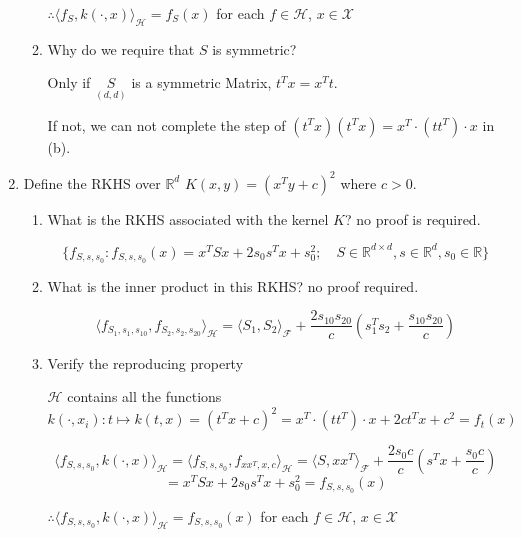 \documentclass[11pt]{article}
\DeclareMathOperator{\trace}{trace}
\begin{document}
\begin{enumerate}
\begin{enumerate}
$\therefore\langle f_{S},k(\cdot,x)\rangle_{\mathcal{H}}=f_{S}(x)$ for each $f\in\mathcal{H}$, $x\in\mathcal{X}$


\item Why do we require that $S$ is symmetric?

Only if $\underset{(d,d)}{S}$ is a symmetric Matrix, $t^Tx=x^Tt$.


If not, we can not complete the step of $(t^Tx)(t^Tx)=x^T\cdot (tt^T)\cdot x$ in (b).


\end{enumerate}

\item Define the RKHS  over $\mathbb{R}^d$ $K(x,y)=(x^Ty+c)^2$ where $c>0$. 

\begin{enumerate}
\item What is the RKHS associated with the kernel $K$? no proof is required. 

$$\{f_{S,s,s_0}: f_{S,s,s_{0}}(x)=x^T S x+2s_0 s^Tx+s_0^2;\quad S\in\mathbb{R}^{d\times d},s\in\mathbb{R}^{d},s_0\in\mathbb{R}\}$$


\item What is the inner product in this RKHS? no proof required.  


$$\langle f_{S_1,s_1,s_{10}},f_{S_2,s_2,s_{20}}\rangle_{\mathcal{H}}=\langle S_1,S_2\rangle_{\mathcal{F}}+\frac{2s_{10}s_{20}}c(s_1^Ts_2+\frac{s_{10}s_{20}}c)$$

\item Verify the reproducing property

$\mathcal{H}$ contains all the functions 
$k(\cdot,x_i): t\mapsto k(t,x)=(t^Tx+c)^2=x^T\cdot (tt^T)\cdot x+2ct^Tx+c^2=f_t(x)$


$$\langle f_{S,s,s_{0}},k(\cdot,x)\rangle_{\mathcal{H}}=\langle f_{S,s,s_{0}},f_{xx^T,x,c}\rangle_{\mathcal{H}}=\langle S,xx^T\rangle_{\mathcal{F}}+\frac{2s_{0}c}c(s^Tx+\frac{s_{0}c}c)$$
$$=x^T Sx+2s_{0}s^Tx+s_0^2= f_{S,s,s_{0}}(x)$$

$\therefore\langle f_{S,s,s_{0}},k(\cdot,x)\rangle_{\mathcal{H}}=f_{S,s,s_{0}}(x)$ for each $f\in\mathcal{H}$, $x\in\mathcal{X}$

\end{enumerate}

\end{enumerate}
\end{document}
